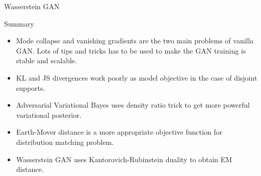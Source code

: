 \begin{frame}{Wasserstein GAN}
\end{frame}
\begin{frame}{Summary}
	\begin{itemize}
		\item Mode collapse and vanishing gradients are the two main problems of vanilla GAN.  Lots of tips and tricks has to be used to make the GAN training is stable and scalable.
		\vfill
		\item KL and JS divergences work poorly as model objective in the case of disjoint supports.
		\vfill
		\item Adversarial Variational Bayes uses density ratio trick to get more powerful variational posterior.
		\vfill
		\item Earth-Mover distance is a more appropriate objective function for distribution matching problem.	
		\vfill
		\item Wasserstein GAN uses Kantorovich-Rubinstein duality to obtain EM distance.
	\end{itemize}
\end{frame}
 